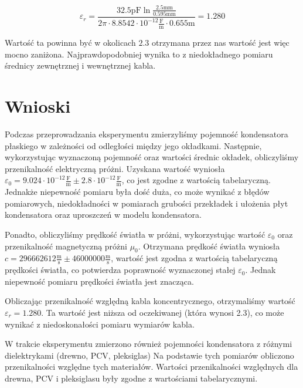 \documentclass{fizykalab}
\newcommand{\mm}{\ensuremath{\text{mm}}}
\newcommand{\Fm}{\ensuremath{\frac{\text{F}}{\text{m}}}}
\begin{document}
\begin{equation*}
\varepsilon_r = \frac{32.5 \text{pF}
\ln \frac{2.5 \mm}{0.595 \mm}}{2 \pi  \cdot 8.8542 \cdot 10^{-12} 
\Fm \cdot 0.655 \text{m}} = 1.280 
\end{equation*}

Wartość ta powinna być w okolicach $2.3$
otrzymana przez nas wartość jest więc mocno
zaniżona. Najprawdopodobniej wynika
to z niedokładnego
pomiaru średnicy zewnętrznej i wewnętrznej
kabla.

\section{Wnioski}

Podczas przeprowadzania eksperymentu zmierzyliśmy pojemność kondensatora 
płaskiego w zależności od odległości między jego okładkami. Następnie,
wykorzystując wyznaczoną pojemność oraz wartości średnic okładek,
obliczyliśmy przenikalność elektryczną próżni.
Uzyskana wartość wyniosła $\varepsilon_0 =  9.024 \cdot 10^{-12} \Fm \pm 2.8 \cdot 10^{-12} \Fm $,
co jest zgodne z wartością tabelaryczną.
Jednakże niepewność pomiaru była dość duża,
co może wynikać z błędów pomiarowych,
niedokładności w pomiarach grubości przekładek i ułożenia płyt kondensatora
oraz uproszczeń w modelu kondensatora.

Ponadto, obliczyliśmy prędkość światła w próżni,
wykorzystując wartość $\varepsilon_0$ oraz przenikalność magnetyczną
próżni $\mu_0$. Otrzymana prędkość światła wyniosła 
$c = 296662612 \frac{\text{m}}{\text{s}} \pm 46000000 \frac{\text{m}}{\text{s}}$, 
wartość jest zgodna z wartością tabelaryczną prędkości światła, co potwierdza poprawność wyznaczonej stałej $\varepsilon_0$. Jednak niepewność pomiaru prędkości światła jest znacząca.

 Obliczając przenikalność względną kabla koncentrycznego, otrzymaliśmy wartość $\varepsilon_r = 1.280$. Ta wartość jest niższa od oczekiwanej (która wynosi 2.3), co może wynikać z niedoskonałości pomiaru wymiarów kabla.

W trakcie eksperymentu zmierzono również pojemności kondensatora z różnymi dielektrykami (drewno, PCV, pleksiglas)  Na podstawie tych pomiarów obliczono przenikalności względne tych materiałów. Wartości przenikalności względnych dla drewna, PCV i pleksiglasu były zgodne z wartościami tabelarycznymi.
\end{document}
